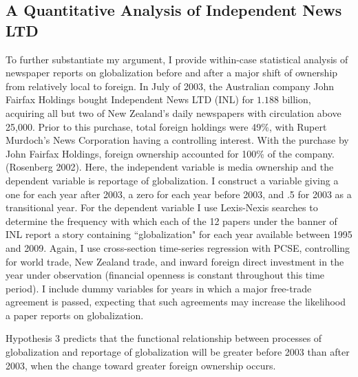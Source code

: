 \documentclass[12pt]{report}
\begin{document}
\subsection{A Quantitative Analysis of Independent News LTD}
To further substantiate my argument, I provide within-case statistical analysis of newspaper reports on globalization before and after a major shift of ownership from relatively local to foreign. In July of 2003, the
Australian company John Fairfax Holdings bought Independent News LTD (INL) for $1.188$ billion,
acquiring all but two of New Zealand's daily newspapers with circulation above 25,000. Prior to this
purchase, total foreign holdings were 49\%, with Rupert Murdoch's News Corporation having a
controlling interest. With the purchase by John Fairfax Holdings, foreign ownership accounted for
100\% of the company. (Rosenberg 2002).     Here, the independent variable is media ownership and
the dependent variable is reportage of globalization. I construct a variable giving a one for each
year after 2003, a zero for each year before 2003, and .5 for 2003 as a transitional year. For the
dependent variable I use Lexis-Nexis searches to determine the frequency with which each of the 12
papers under the banner of INL report a story containing ``globalization" for each year available
between 1995 and 2009. Again, I use cross-section time-series regression with PCSE, controlling for
world trade, New Zealand trade, and inward foreign direct investment in the year under observation
(financial openness is constant throughout this time period). I include dummy variables for years in
which a major free-trade agreement is passed, expecting that such agreements may increase the
likelihood a paper reports on globalization.

Hypothesis 3 predicts that the functional relationship between processes of globalization and
reportage of globalization will be greater before 2003 than after 2003, when the change toward
greater foreign ownership occurs.
\end{document}
